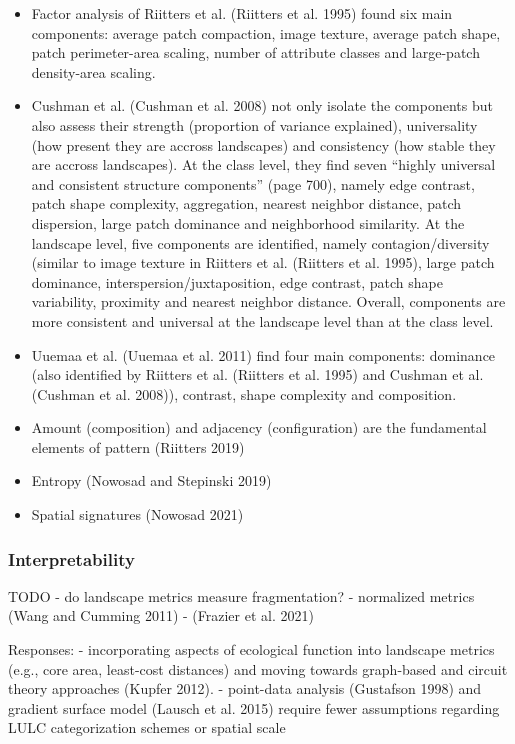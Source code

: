 \documentclass[
  10pt,
  a4paperpaper,
]{article}
\begin{document}
\begin{itemize}
\item
  Factor analysis of Riitters et al. (Riitters et al. 1995) found six
  main components: average patch compaction, image texture, average
  patch shape, patch perimeter-area scaling, number of attribute classes
  and large-patch density-area scaling.
\item
  Cushman et al. (Cushman et al. 2008) not only isolate the components
  but also assess their strength (proportion of variance explained),
  universality (how present they are accross landscapes) and consistency
  (how stable they are accross landscapes). At the class level, they
  find seven ``highly universal and consistent structure components''
  (page 700), namely edge contrast, patch shape complexity, aggregation,
  nearest neighbor distance, patch dispersion, large patch dominance and
  neighborhood similarity. At the landscape level, five components are
  identified, namely contagion/diversity (similar to image texture in
  Riitters et al. (Riitters et al. 1995), large patch dominance,
  interspersion/juxtaposition, edge contrast, patch shape variability,
  proximity and nearest neighbor distance. Overall, components are more
  consistent and universal at the landscape level than at the class
  level.
\item
  Uuemaa et al. (Uuemaa et al. 2011) find four main components:
  dominance (also identified by Riitters et al. (Riitters et al. 1995)
  and Cushman et al. (Cushman et al. 2008)), contrast, shape complexity
  and composition.
\item
  Amount (composition) and adjacency (configuration) are the fundamental
  elements of pattern (Riitters 2019)
\item
  Entropy (Nowosad and Stepinski 2019)
\item
  Spatial signatures (Nowosad 2021)
\end{itemize}

\subsubsection{Interpretability}\label{interpretability}

TODO - do landscape metrics measure fragmentation? - normalized metrics
(Wang and Cumming 2011) - (Frazier et al. 2021)

Responses: - incorporating aspects of ecological function into landscape
metrics (e.g., core area, least-cost distances) and moving towards
graph-based and circuit theory approaches (Kupfer 2012). - point-data
analysis (Gustafson 1998) and gradient surface model (Lausch et al.
2015) require fewer assumptions regarding LULC categorization schemes or
spatial scale
\end{document}
